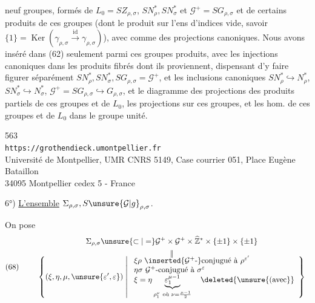 
neuf groupes,  formés de $L_{0}=SZ_{\rho,\sigma}$, $SN_{\rho}^{*},SN_{\sigma}^{*}$ et $\mathcal{G}^{+}=SG_{\rho,\sigma}$ et de certains produits de ces groupes (dont le produit sur l'ens d'indices vide, savoir $\{1\}=\operatorname{Ker}(\gamma_{\rho,\sigma}\xrightarrow{\mathrm{id}}\gamma_{\rho,\sigma})$), avec comme  des projections canoniques. Nous avons inséré dans (62) seulement  parmi ces groupes produits, avec les injections canoniques dans les produits fibrés dont ils proviennent,  dispensant d'y faire figurer séparément $SN_{\rho}^{*},SN_{\sigma}^{*},SG_{\rho,\sigma}=\mathcal{G}^{+}$, et les inclusions canoniques $SN_{\rho}^{*}\hookrightarrow N_{\rho}^{*}$, $SN_{\sigma}^{*}\hookrightarrow N_{\sigma}^{*}$, $\mathcal{G}^{+}=SG_{\rho,\sigma}\hookrightarrow G_{\rho,\sigma}$, et le  diagramme  des projections des produits partiels de ces groupes et de $L_{0}$,   les projections sur ces  groupes, et les hom. de ces groupes et de $L_{0}$ dans le groupe unité.


{\small
\begin{center}
563\\
\texttt{https://grothendieck.umontpellier.fr}\\
Université de Montpellier, UMR CNRS 5149, Case courrier 051, Place Eugène Bataillon\\
34095 Montpellier cedex 5 - France
\end{center}
}


6°) \uline{L'ensemble} $\Sigma_{\rho,\sigma},S\unsure{\mathcal{G}|g}_{\rho,\sigma}$.

On pose
\[
\text{(68)}\qquad
\begin{gathered}
\Sigma_{\rho,\sigma}\unsure{\subset|=}\mathcal{G}^{+}\times\mathcal{G}^{+}\times\widehat{\mathbb Z}^{*}\times\{\pm1\}\times\{\pm1\}\\
\begin{array}{c}
\Vert\\[-0.4em]
\displaystyle
\left\{(\xi,\eta,\mu,\unsure{\varepsilon',\varepsilon})\;\middle|\;
\begin{array}{l}
\xi\rho\ \inserted{\mathcal{G}^{+}\text{-}}\text{conjugué à }\rho^{\varepsilon'}\\
\eta\sigma\ \mathcal{G}^{+}\text{-conjugué à }\sigma^{\varepsilon}\\
\xi=\eta\underbrace{\varepsilon_{1}^{\mu-1}}_{\rho_{1}^{\nu}\ \text{où }\nu=\frac{\mu-1}{2}}\quad\deleted{\unsure{\text{(avec}}}
\end{array}\right\}
\end{array}
\end{gathered}
\]

